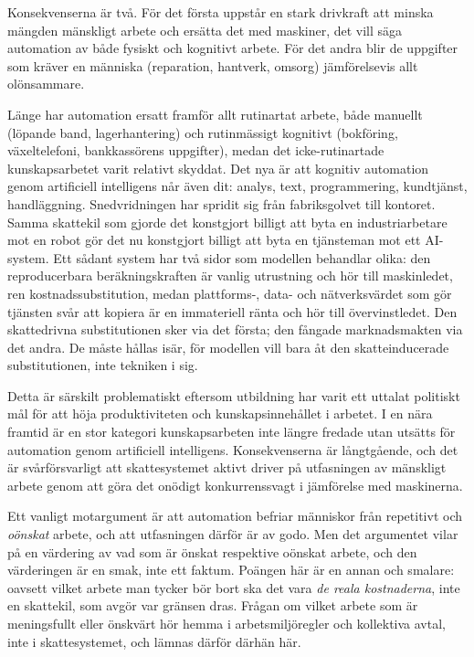 \documentclass[11pt]{article}
\begin{document}
Konsekvenserna är två. För det första uppstår en stark drivkraft att minska mängden mänskligt arbete och ersätta det med maskiner, det vill säga automation av både fysiskt och kognitivt arbete. För det andra blir de uppgifter som kräver en människa (reparation, hantverk, omsorg) jämförelsevis allt olönsammare.

Länge har automation ersatt framför allt rutinartat arbete, både manuellt (löpande band, lagerhantering) och rutinmässigt kognitivt (bokföring, växeltelefoni, bankkassörens uppgifter), medan det icke-rutinartade kunskapsarbetet varit relativt skyddat. Det nya är att kognitiv automation genom artificiell intelligens når även dit: analys, text, programmering, kundtjänst, handläggning. Snedvridningen har spridit sig från fabriksgolvet till kontoret. Samma skattekil som gjorde det konstgjort billigt att byta en industriarbetare mot en robot gör det nu konstgjort billigt att byta en tjänsteman mot ett AI-system. Ett sådant system har två sidor som modellen behandlar olika: den reproducerbara beräkningskraften är vanlig utrustning och hör till maskinledet, ren kostnadssubstitution, medan plattforms-, data- och nätverksvärdet som gör tjänsten svår att kopiera är en immateriell ränta och hör till övervinstledet. Den skattedrivna substitutionen sker via det första; den fångade marknadsmakten via det andra. De måste hållas isär, för modellen vill bara åt den skatteinducerade substitutionen, inte tekniken i sig.

Detta är särskilt problematiskt eftersom utbildning har varit ett uttalat politiskt mål för att höja produktiviteten och kunskapsinnehållet i arbetet. I en nära framtid är en stor kategori kunskapsarbeten inte längre fredade utan utsätts för automation genom artificiell intelligens. Konsekvenserna är långtgående, och det är svårförsvarligt att skattesystemet aktivt driver på utfasningen av mänskligt arbete genom att göra det onödigt konkurrenssvagt i jämförelse med maskinerna.

Ett vanligt motargument är att automation befriar människor från repetitivt och \emph{oönskat} arbete, och att utfasningen därför är av godo. Men det argumentet vilar på en värdering av vad som är önskat respektive oönskat arbete, och den värderingen är en smak, inte ett faktum. Poängen här är en annan och smalare: oavsett vilket arbete man tycker bör bort ska det vara \emph{de reala kostnaderna}, inte en skattekil, som avgör var gränsen dras. Frågan om vilket arbete som är meningsfullt eller önskvärt hör hemma i arbetsmiljöregler och kollektiva avtal, inte i skattesystemet, och lämnas därför därhän här.
\end{document}
